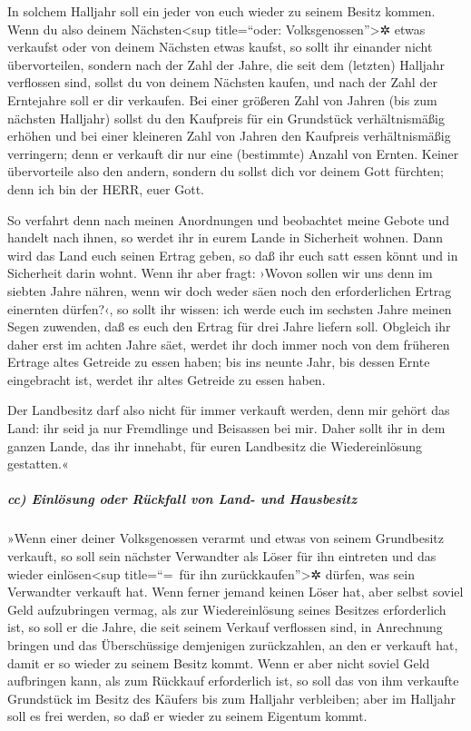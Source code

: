 In solchem Halljahr soll ein jeder von euch wieder zu
seinem Besitz kommen. Wenn du also deinem
Nächsten\textless sup title=``oder: Volksgenossen''\textgreater✲ etwas
verkaufst oder von deinem Nächsten etwas kaufst, so sollt ihr einander
nicht übervorteilen, sondern nach der Zahl der Jahre, die
seit dem (letzten) Halljahr verflossen sind, sollst du von deinem
Nächsten kaufen, und nach der Zahl der Erntejahre soll er dir verkaufen.
Bei einer größeren Zahl von Jahren (bis zum nächsten
Halljahr) sollst du den Kaufpreis für ein Grundstück verhältnismäßig
erhöhen und bei einer kleineren Zahl von Jahren den Kaufpreis
verhältnismäßig verringern; denn er verkauft dir nur eine (bestimmte)
Anzahl von Ernten. Keiner übervorteile also den andern,
sondern du sollst dich vor deinem Gott fürchten; denn ich bin der HERR,
euer Gott.

So verfahrt denn nach meinen Anordnungen und beobachtet
meine Gebote und handelt nach ihnen, so werdet ihr in eurem Lande in
Sicherheit wohnen. Dann wird das Land euch seinen Ertrag
geben, so daß ihr euch satt essen könnt und in Sicherheit darin wohnt.
Wenn ihr aber fragt: ›Wovon sollen wir uns denn im
siebten Jahre nähren, wenn wir doch weder säen noch den erforderlichen
Ertrag einernten dürfen?‹, so sollt ihr wissen: ich werde
euch im sechsten Jahre meinen Segen zuwenden, daß es euch den Ertrag für
drei Jahre liefern soll. Obgleich ihr daher erst im
achten Jahre säet, werdet ihr doch immer noch von dem früheren Ertrage
altes Getreide zu essen haben; bis ins neunte Jahr, bis dessen Ernte
eingebracht ist, werdet ihr altes Getreide zu essen haben.

Der Landbesitz darf also nicht für immer verkauft werden,
denn mir gehört das Land: ihr seid ja nur Fremdlinge und Beisassen bei
mir. Daher sollt ihr in dem ganzen Lande, das ihr
innehabt, für euren Landbesitz die Wiedereinlösung gestatten.«

\hypertarget{cc-einluxf6sung-oder-ruxfcckfall-von-land--und-hausbesitz}{%
\subparagraph{cc) Einlösung oder Rückfall von Land- und
Hausbesitz}\label{cc-einluxf6sung-oder-ruxfcckfall-von-land--und-hausbesitz}}

»Wenn einer deiner Volksgenossen verarmt und etwas von
seinem Grundbesitz verkauft, so soll sein nächster Verwandter als Löser
für ihn eintreten und das wieder einlösen\textless sup title=``=~für ihn
zurückkaufen''\textgreater✲ dürfen, was sein Verwandter verkauft hat.
Wenn ferner jemand keinen Löser hat, aber selbst soviel
Geld aufzubringen vermag, als zur Wiedereinlösung seines Besitzes
erforderlich ist, so soll er die Jahre, die seit seinem
Verkauf verflossen sind, in Anrechnung bringen und das Überschüssige
demjenigen zurückzahlen, an den er verkauft hat, damit er so wieder zu
seinem Besitz kommt. Wenn er aber nicht soviel Geld
aufbringen kann, als zum Rückkauf erforderlich ist, so soll das von ihm
verkaufte Grundstück im Besitz des Käufers bis zum Halljahr verbleiben;
aber im Halljahr soll es frei werden, so daß er wieder zu seinem
Eigentum kommt.

